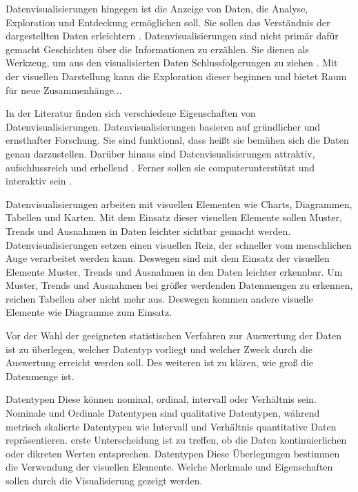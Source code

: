 Datenvisualisierungen hingegen ist die Anzeige von Daten, die Analyse, Exploration und Entdeckung ermöglichen soll. Sie sollen das Verständnis der dargestellten Daten erleichtern
\cite[Vgl.][20 ff.]{kirk_data_2019}.
Datenvisualisierungen sind nicht primär dafür gemacht Geschichten über die Informationen zu erzählen. Sie dienen als Werkzeug, um aus den visualisierten Daten Schlussfolgerungen zu ziehen 
\cite[Vgl.][31]{cairo_truthful_2016}. %
Mit der visuellen Darstellung kann die Exploration dieser beginnen und bietet Raum für neue Zusammenhänge...

In der Literatur finden sich verschiedene Eigenschaften von Datenvisualisierungen.
Datenvisualisierungen basieren auf gründlicher und ernsthafter Forschung. Sie sind funktional, dass heißt
sie bemühen sich die Daten genau darzustellen. Darüber hinaus sind Datenvisualisierungen attraktiv, 
aufschlussreich und erhellend \cite[Vgl.][45]{cairo_truthful_2016}. 
Ferner sollen sie computerunterstützt und interaktiv sein \cite[Vgl.][12]{few_now_2009}.


Datenvisualisierungen arbeiten mit visuellen Elementen wie Charts, Diagrammen, Tabellen und Karten.
Mit dem Einsatz dieser visuellen Elemente sollen Muster, Trends und Ausnahmen in Daten leichter sichtbar gemacht werden\cite[Vgl.][12]{few_now_2009}.
Datenvisualisierungen setzen einen visuellen Reiz, der schneller vom menschlichen Auge verarbeitet werden kann. 
Deswegen sind mit dem Einsatz der visuellen Elemente Muster, Trends und Ausnahmen in den Daten leichter erkennbar.
Um Muster, Trends und Ausnahmen bei größer werdenden Datenmengen zu erkennen, reichen Tabellen aber nicht mehr aus. Deswegen
kommen andere visuelle Elemente wie Diagramme zum Einsatz. 

Vor der Wahl der geeigneten statistischen Verfahren zur Auswertung der Daten ist zu überlegen, welcher Datentyp vorliegt und welcher Zweck durch die Auswertung 
erreicht werden soll. Des weiteren ist zu klären, wie groß die Datenmenge ist. 

Datentypen  \cite[99]{kirk_data_2019} Diese können nominal, ordinal, intervall oder Verhältnis sein. Nominale und Ordinale Datentypen 
sind qualitative Datentypen, während metrisch skalierte Datentypen wie Intervall und Verhältnis quantitative Daten repräsentieren. 
\cites[Vgl.][]{bortz_statistik_2010}[Vgl.][98 ff.]{kirk_data_2019} erste Unterscheidung ist zu treffen, ob die Daten kontinuierlichen oder dikreten Werten entsprechen.
Datentypen  
Diese Überlegungen bestimmen die Verwendung der visuellen Elemente. 
Welche Merkmale und Eigenschaften sollen durch die Visualisierung gezeigt werden.\cite[Vgl.][17]{kirk_data_2019}

